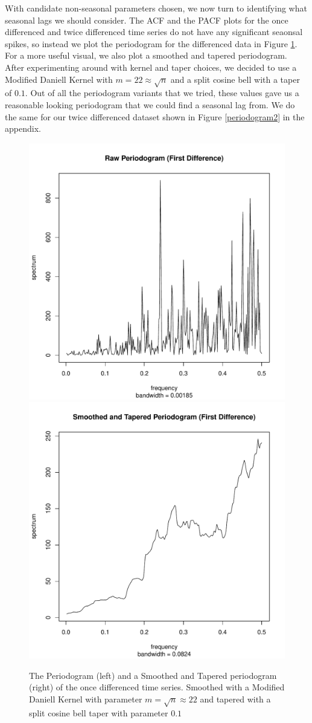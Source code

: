 \documentclass[11pt]{paper}
\begin{document}

With candidate non-seasonal parameters chosen, we now turn to identifying what seasonal lags we should consider. The ACF and the PACF plots for the once differenced and twice differenced time series do not have any significant seaonsal spikes, so instead we plot the periodogram for the differenced data in Figure \ref{periodogram}. For a more useful visual, we also plot a smoothed and tapered periodogram. After experimenting around with kernel and taper choices, we decided to use a Modified Daniell Kernel with $m = 22 \approx \sqrt{n}$ and a split cosine bell with a taper of $0.1$. Out of all the periodogram variants that we tried, these values gave us a reasonable looking periodogram that we could find a seasonal lag from. We do the same for our twice differenced dataset shown in Figure \ref{periodogram2} in the appendix.

\begin{figure}
\centering
\includegraphics[width=0.45\linewidth]{../image/raw_periodogram.pdf}
\includegraphics[width=0.45\linewidth]{../image/smooth_tapered_periodogram.pdf}
\caption{The Periodogram (left) and a Smoothed and Tapered periodogram (right) of the once differenced time series. Smoothed with a Modified Daniell Kernel with parameter $m = \sqrt{n} \approx 22$ and tapered with a split cosine bell taper with parameter $0.1$}
\label{periodogram}
\end{figure}
\end{document}

